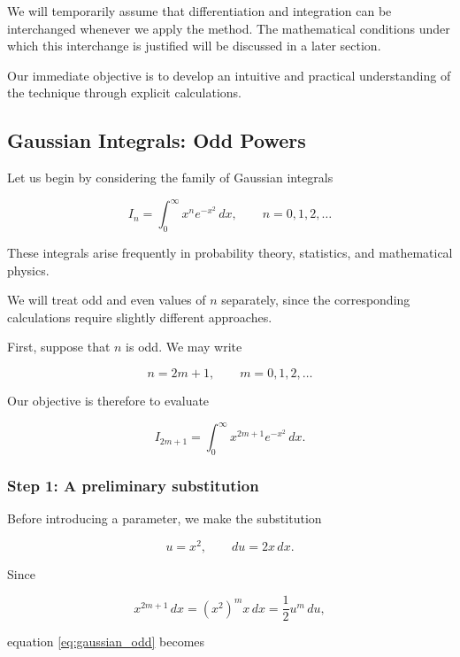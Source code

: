 \documentclass[11pt,a4paper]{article}
\theoremstyle{definition}
\theoremstyle{remark}
\begin{document}
We will temporarily assume that
differentiation and integration can be
interchanged whenever we apply the method.
The mathematical conditions under which
this interchange is justified will be
discussed in a later section.

Our immediate objective is to develop
an intuitive and practical understanding
of the technique through explicit
calculations.

\subsection{Gaussian Integrals: Odd Powers}

Let us begin by considering the family
of Gaussian integrals

\begin{equation}
    I_n =
    \int_0^\infty x^n e^{-x^2}\,dx,
    \qquad n=0,1,2,\ldots
    \label{eq:gaussian_general}
\end{equation}

These integrals arise frequently in
probability theory, statistics, and
mathematical physics.

We will treat odd and even values of
$n$ separately, since the corresponding
calculations require slightly different
approaches.

First, suppose that $n$ is odd.
We may write

\[
    n=2m+1,
    \qquad m=0,1,2,\ldots
\]

Our objective is therefore to evaluate

\begin{equation}
    I_{2m+1}
    =
    \int_0^\infty
    x^{2m+1}e^{-x^2}\,dx.
    \label{eq:gaussian_odd}
\end{equation}

\subsubsection*{Step 1: A preliminary substitution}

Before introducing a parameter, we
make the substitution

\[
    u=x^2,
    \qquad du=2x\,dx.
\]

Since

\[
    x^{2m+1}\,dx
    =
    (x^2)^m x\,dx
    =
    \frac{1}{2}u^m\,du,
\]

equation \eqref{eq:gaussian_odd}
becomes
\end{document}
